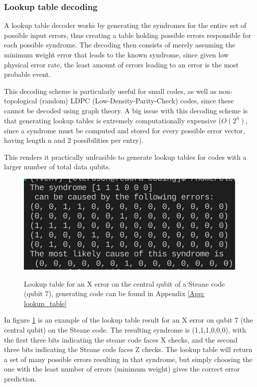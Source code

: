 \subsubsection{Lookup table decoding}
A lookup table decoder works by generating the 
syndromes for the entire set of possible input errors, thus creating a 
table holding possible errors responsible for each possible syndrome.
The decoding then consists of merely assuming the minimum weight
error that leads to the known syndrome, since given low physical 
error rate, the least amount of errors leading to an error is the most
probable event.

This decoding scheme is particularly useful for small codes, as well 
as non-topological (random) LDPC (Low-Density-Parity-Check) codes, since
these cannot be decoded using graph theory.
A big issue with this decoding scheme is that generating lookup tables is
extremely computationally expensive ($O(2^n)$, since a syndrome must be computed
and stored for every possible error vector, having length n and 2 possibilities per
entry). 

This renders it practically
unfeasible to generate lookup tables for codes with a larger number
of total data qubits.

\begin{figure}[h!]
	\begin{center}
	\captionsetup{justification=centering,margin=2cm}
	\includegraphics[scale=0.5]{./img/figures/X7errorlookup.png}\\
	\caption{Lookup table for an X error on the central qubit of
    a Steane code (qubit 7), generating code can be found in Appendix
    \ref{App: lookup_table}}
        
	\label{fig: lookup_table}
	\end{center}
\end{figure}

In figure \ref{fig: lookup_table} is an example of the lookup table result for
an X error on qubit 7 (the central qubit) on the Steane code. 
The resulting syndrome is (1,1,1,0,0,0), with the first three
bits indicating the steane code faces X checks, and the second three bits
indicating the Steane code faces Z checks. 
The lookup table will return a set of many possible errors resulting in 
that syndrome, but simply choosing the one with the least number of errors 
(minimum weight) gives the correct error prediction.